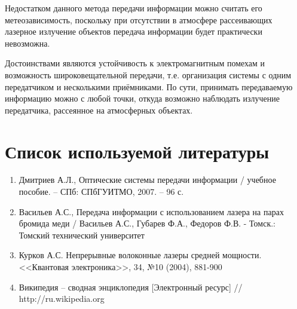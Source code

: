 \documentclass[14pt,pscyr,titlepage]{hedreport}
\begin{document}
		Недостатком данного метода передачи информации можно считать его 
		метеозависимость, поскольку при отсутствии в атмосфере рассеивающих 
		лазерное излучение объектов передача информации будет практически 
		невозможна.

		Достоинствами являются устойчивость к электромагнитным помехам и 
		возможность широковещательной передачи, т.е. организация системы с 
		одним передатчиком и несколькими приёмниками. По сути, принимать 
		передаваемую информацию можно с любой точки, откуда возможно 
		наблюдать излучение передатчика, рассеянное на атмосферных объектах. 
	
	\pagebreak
	\section{Список используемой литературы}
		\begin{enumerate}\itemsep-2pt
			\item Дмитриев А.Л., Оптические системы передачи информации / 
				учебное пособие. -- СПб: СПбГУИТМО, 2007. -- 96 с.
			\item Васильев А.С., Передача информации с использованием лазера 
				на парах бромида меди / Васильев А.С., Губарев Ф.А., 
				Федоров Ф.В. - Томск.: Томский технический университет 
			\item Курков А.С. Непрерывные волоконные лазеры средней мощности.
				<<Квантовая электроника>>, 34, №10 (2004), 881-900
			\item Википедия -- сводная энциклопедия [Электронный ресурс] // \\
				http://ru.wikipedia.org
		\end{enumerate}
\end{document}
